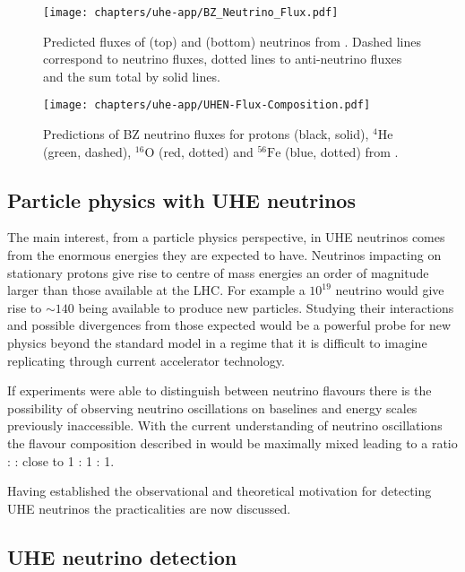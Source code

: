 \begin{figure}[htpb]
  \centering
  \texttt{[image: chapters/uhe-app/BZ\_Neutrino\_Flux.pdf]}
  \caption{Predicted fluxes of \Pnue (top) and \Pnum (bottom) neutrinos from \cite{PhysRevD.64.093010}. Dashed lines correspond to neutrino fluxes, dotted lines to anti-neutrino fluxes and the sum total by solid lines.}
  \label{fig:uhe-app:UHEN:UHEN-Flux}
\end{figure}

\begin{figure}[htpb]
  \centering
  \texttt{[image: chapters/uhe-app/UHEN-Flux-Composition.pdf]}
  \caption{Predictions of BZ neutrino fluxes for protons (black, solid), $^4\mbox{He}$ (green, dashed), $^16 \mbox{O}$ (red, dotted) and $^56\mbox{Fe}$ (blue, dotted) from \cite{Hooper200511}.}
  \label{fig:uhe-app:UHEN:UHEN-Flux-Composition-Models}
\end{figure}

\subsection{Particle physics with UHE neutrinos}
\label{sec:uhe-app:UHEN:particle-physics}

The main interest, from a particle physics perspective, in UHE neutrinos comes from the enormous energies they are expected to have. Neutrinos impacting on stationary protons give rise to centre of mass energies an order of magnitude larger than those available at the LHC. For example a $10^{19}$ \eV neutrino would give rise to $\sim 140$ \TeV being available to produce new particles. Studying their interactions and possible divergences from those expected would be a powerful probe for new physics beyond the standard model in a regime that it is difficult to imagine replicating through current accelerator technology.

If experiments were able to distinguish between neutrino flavours there is the possibility of observing neutrino oscillations on baselines and energy scales previously inaccessible. With the current understanding of neutrino oscillations the flavour composition described in  would be maximally mixed leading to a ratio \Pnue : \Pnum : \Pnut close to 1 : 1 : 1.

Having established the observational and theoretical motivation for detecting UHE neutrinos the practicalities are now discussed.

\subsection{UHE neutrino detection}
\label{sec:uhe-app:UHEN:detection}

